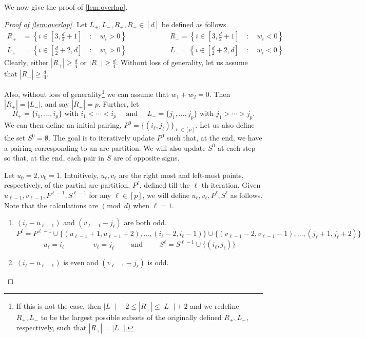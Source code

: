 \documentclass{article}
\begin{document}
We now give the proof of \autoref{lem:overlap}.

\begin{proof}[Proof of \autoref{lem:overlap}]
    Let $L_+, L_-, R_+, R_- \in [d]$ be defined as follows.
    \begin{align*}
        R_+ &= \left\{i \in  \left[ 3, \frac{d}{2}+1 \right] \quad : \quad w_i > 0 \right\}
        \qquad \qquad \qquad
        R_- = \left\{i \in  \left[ 3, \frac{d}{2}+1 \right] \quad : \quad w_i < 0 \right\}\\
        L_+ &= \left\{i \in  \left[\frac{d}{2}+2, d \right] \quad : \quad w_i > 0 \right\}
        \qquad \qquad \qquad
        L_- = \left\{i \in  \left[\frac{d}{2}+2, d \right] \quad : \quad w_i < 0 \right\}
    \end{align*}
    Clearly, either $|R_+|\geq\frac{d}{4}$ or $|R_-|\geq\frac{d}{4}$.
    Without loss of generality, let us assume that $|R_+|\geq\frac{d}{4}$.
    
    Also, without loss of generality\footnote{If this is not the case, then $|L_-| -2 \leq |R_+| \leq |L_-| + 2$ and we redefine $R_+, L_-$ to be the largest possible subsets of the originally defined $R_+, L_-$, respectively, such that $|R_+| = |L_-|$.} we can assume that $w_1 + w_2 = 0$.
    Then $|R_+| = |L_-|$, and say $|R_+| = p$.
    Further, let 
    \[
        R_+ = \{i_1, \ldots, i_p\} \text{ with } i_1 < \cdots < i_p \quad \text{ and } \quad L_- = \{j_1, \ldots, j_p\} \text{ with } j_1 > \cdots > j_p.
    \]
    We can then define an initial pairing, $P^0 = \{(i_\ell, j_\ell)\}_{\ell \in [p]}$.
    Let us also define the set $S^0 = \emptyset$.
    The goal is to iteratively update $P^0$ such that, at the end, we have a pairing corresponding to an arc-partition. 
    We will also update $S^0$ at each step so that, at the end, each pair in $S$ are of opposite signs.
    
    Let $u_0=2, v_0=1$.
    Intuitively, $u_\ell, v_\ell$ are the right most and left-most points, respectively, of the partial arc-partition, $P^\ell$, defined till the $\ell$-th iteration.
    Given $u_{\ell-1}, v_{\ell-1}, P^{\ell-1}, S^{\ell -1}$ for any $\ell \in [p]$, we will define $u_\ell, v_\ell, P^\ell, S^\ell$ as follows.
    Note that the calculations are $\pmod d$ when $\ell=1$.
    \begin{enumerate}
        \item[\underline{\textbf{Case 1:}} ]  $(i_\ell - u_{\ell-1})$ and $(v_{\ell-1} - j_\ell)$ are both odd.
        \[
            P^\ell = P^{\ell-1} \cup \{(u_{\ell-1}+1, u_{\ell-1}+2), \ldots, (i_\ell -2, i_\ell -1)\} \cup \{(v_{\ell-1}-2, v_{\ell-1}-1), \ldots, (j_\ell +1, j_\ell +2)\}
        \]
        \[
            u_\ell = i_\ell \qquad \qquad v_\ell = j_\ell \qquad \text{ and } \qquad S^\ell = S^{\ell -1} \cup \{(i_\ell, j_\ell) \}
        \]
        \item[\underline{\textbf{Case 2:}} ] $(i_\ell - u_{\ell-1})$ is even and $(v_{\ell-1} - j_\ell)$ is odd.
        

\end{enumerate}
\end{proof}
\end{document}
